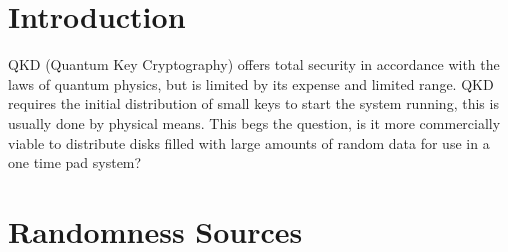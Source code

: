 \documentclass{paper}
\begin{document}
	\maketitle
	\section{Introduction}
		QKD (Quantum Key Cryptography) offers total security in accordance with the laws of quantum physics, but is limited by its expense and limited range. QKD requires the initial distribution of small keys to start the system running, this is usually done by physical means. This begs the question, is it more commercially viable to distribute disks filled with large amounts of random data for use in a one time pad system? \\
		
	
	\section{Randomness Sources}
			
						
\end{document}
